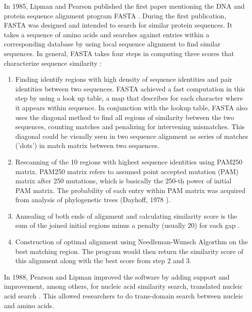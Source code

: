 In 1985, Lipman and Pearson published the first paper mentioning the DNA and protein sequence alignment program FASTA \citep{Lipman85}. During the first publication, FASTA was designed and intended to search for similar protein sequences. It takes a sequence of amino acids and searches against entries within a corresponding database by using local sequence alignment to find similar sequences. In general, FASTA takes four steps in computing three scores that characterize sequence similarity \citep{Pearson19905}:

\begin{enumerate}
\item Finding identify regions with high density of sequence identities and pair identities between two sequences. FASTA achieved a fast computation in this step by using a look up table, a map that describes for each character where it appears within sequence. In conjunction with the lookup table, FASTA also uses the diagonal method to find 
all regions of similarity between the two sequences, counting matches and penalizing for intervening mismatches. This diagonal could be visually seen in two sequence alignment as series of matches ('dots') in match matrix between two sequences.

\item Rescanning of the 10 regions with highest sequence identities using PAM250 matrix. PAM250 matrix refers to assumed point accepted mutation (PAM) matrix after 250 mutations, which is basically the 250-th power of initial PAM matrix. The probability of each entry within PAM matrix was acquired from analysis of phylogenetic trees (Dayhoff, 1978 \citep{Dayhoff1978model}).

\item Annealing of both ends of alignment and calculating similarity score is the sum of the joined initial regions minus a penalty (usually 20) for each gap \citep{Pearson19905}.

\item Construction of optimal alignment using Needleman-Wunsch Algorthm \citep{needleman1970general} on the best matching region. The program would then return the similarity score of this alignment along with the best score from step 2 and 3.
\end{enumerate}

In 1988, Pearson and Lipman improved the software by adding support and improvement, among others, for nucleic acid similarity search, translated nucleic acid search \citep{PearsonLipman88}. This allowed researchers to do trans-domain search between nucleic and amino acids.

